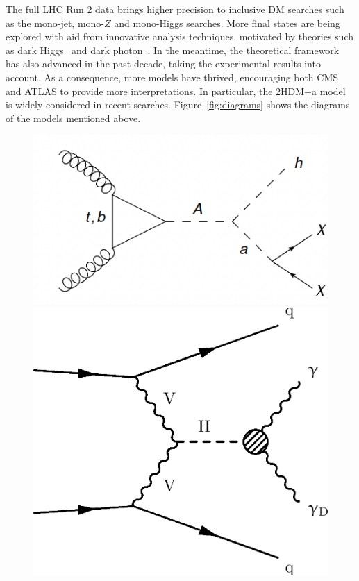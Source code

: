 \documentclass{moriond}
\begin{document}
The full LHC Run 2 data brings higher
precision to inclusive DM searches such as the mono-jet, mono-$Z$ and
mono-Higgs searches. More final states are being explored with aid from
innovative analysis techniques, motivated by theories such as dark
Higgs~\cite{DarkH} and dark photon~\cite{DarkPh}. In the meantime, the
theoretical framework has also advanced in the past decade, taking the
experimental results into account. As a consequence, more models have thrived,
encouraging both CMS and ATLAS to provide more interpretations. In particular,
the 2HDM+a model~\cite{2HDM} is widely considered in recent searches.
Figure~\ref{fig:diagrams} shows the diagrams of the models mentioned above.

\begin{figure} [htb]
\begin{minipage}{0.32\linewidth}
\centerline{\includegraphics[width=0.9\linewidth]{2HDM_a}}
\end{minipage}
\begin{minipage}{0.32\linewidth}
\centerline{\includegraphics[width=0.9\linewidth]{HiggsDarkPhotonDiagram}}

\end{minipage}
\end{figure}
\end{document}
